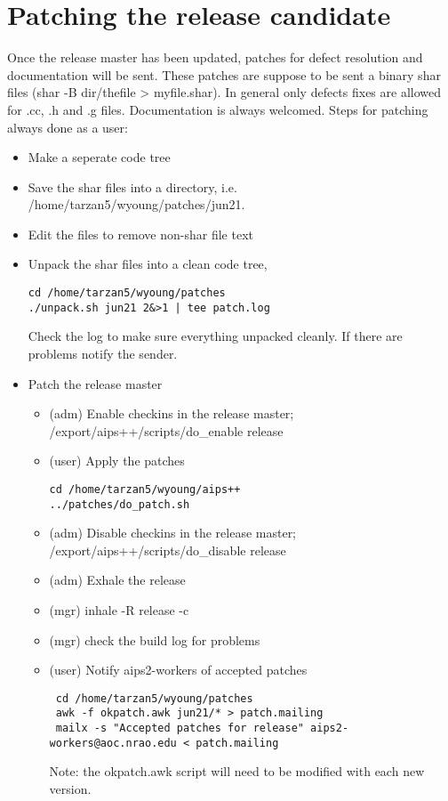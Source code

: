 \section{Patching the release candidate}
Once the release master has been updated, patches for defect resolution and documentation will be
sent.  These patches are suppose to be sent a binary shar files (shar -B dir/thefile > myfile.shar).
In general only defects fixes are allowed for .cc, .h and .g files. Documentation is always welcomed.
Steps for patching always done as a user:
\begin{itemize}
\item Make a seperate code tree
\item Save the shar files into a directory, i.e. /home/tarzan5/wyoung/patches/jun21.
\item Edit the files to remove non-shar file text
\item Unpack the shar files into a clean code tree,
\begin{verbatim}
cd /home/tarzan5/wyoung/patches
./unpack.sh jun21 2&>1 | tee patch.log
\end{verbatim}
Check the log to make sure everything unpacked cleanly.  If there are problems notify the sender.
\item Patch the release master
\begin{itemize}
\item (adm) Enable checkins in the release master; /export/aips++/scripts/do\_enable release
\item (user) Apply the patches
\begin{verbatim}
cd /home/tarzan5/wyoung/aips++
../patches/do_patch.sh
\end{verbatim}
\item (adm) Disable checkins in the release master; /export/aips++/scripts/do\_disable release
\item (adm) Exhale the release
\item (mgr) inhale -R release -c
\item (mgr) check the build log for problems
\item (user) Notify aips2-workers of accepted patches
\begin{verbatim}
 cd /home/tarzan5/wyoung/patches
 awk -f okpatch.awk jun21/* > patch.mailing
 mailx -s "Accepted patches for release" aips2-workers@aoc.nrao.edu < patch.mailing
\end{verbatim}
Note: the okpatch.awk script will need to be modified with each new version.
\end{itemize}
\end{itemize}
